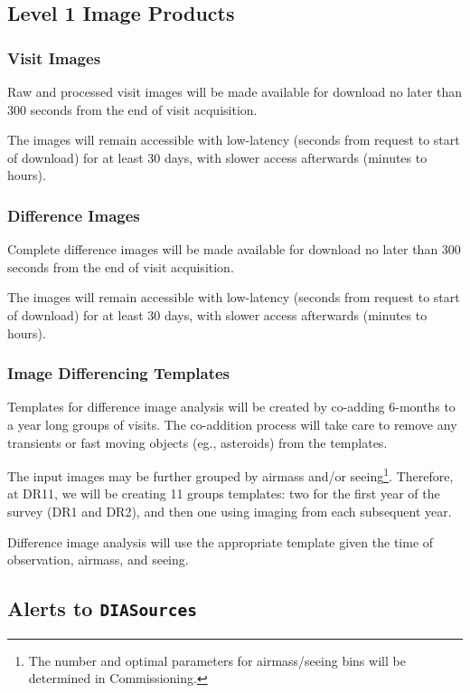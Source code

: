 \documentclass[12pt]{article}
\newcommand{\code}[1]{\texttt{#1}}
\newcommand{\DIASources}{\code{DIASources}\xspace}
\begin{document}
\subsection{Level 1 Image Products}

\subsubsection{Visit Images}

Raw and processed visit images will be made available for download no later than 300 seconds from the end of visit acquisition.

The images will remain accessible with low-latency (seconds from request to start of download) for at least 30 days, with slower access afterwards (minutes to hours).

\subsubsection{Difference Images}
\label{sec:diffims}

Complete difference images will be made available for download no later than 300 seconds from the end of visit acquisition.

The images will remain accessible with low-latency (seconds from request to start of download) for at least 30 days, with slower access afterwards (minutes to hours).

\subsubsection{Image Differencing Templates}
\label{sec:templates}

Templates for difference image analysis will be created by co-adding 6-months to a year long groups of visits. The co-addition process will take care to remove any transients or fast moving objects (eg., asteroids) from the templates.

The input images may be further grouped by airmass and/or seeing\footnote{The number and optimal parameters for airmass/seeing bins will be determined in Commissioning.}. Therefore, at DR11, we will be creating 11 groups templates: two for the first year of the survey (DR1 and DR2), and then one using imaging from each subsequent year.

Difference image analysis will use the appropriate template given the time of observation, airmass, and seeing.

\subsection{Alerts to \DIASources}
\label{sec:voEventContents}
\end{document}
